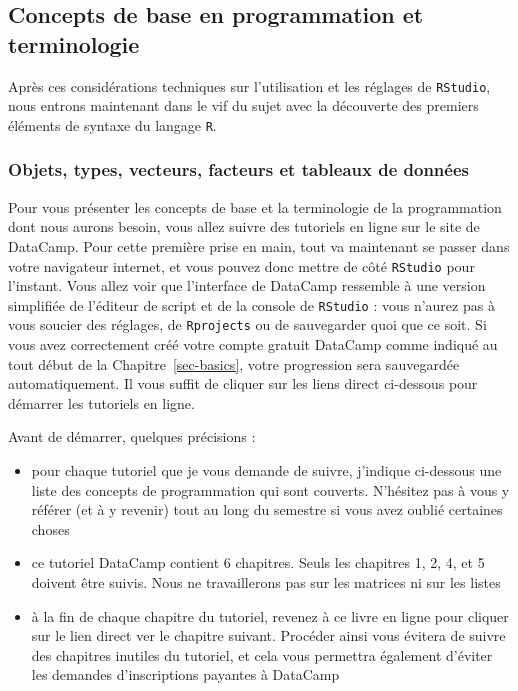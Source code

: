 \documentclass[
  a4paper,
  DIV=11,
  numbers=noendperiod,
  oneside]{scrreprt}
\providecommand{\tightlist}{%
  \setlength{\itemsep}{0pt}\setlength{\parskip}{0pt}}\usepackage{longtable,booktabs,array}
\begin{document}
\subsection{Concepts de base en programmation et
terminologie}\label{concepts-de-base-en-programmation-et-terminologie}

Après ces considérations techniques sur l'utilisation et les réglages de
\texttt{RStudio}, nous entrons maintenant dans le vif du sujet avec la
découverte des premiers éléments de syntaxe du langage \texttt{R}.

\subsubsection{Objets, types, vecteurs, facteurs et tableaux de
données}\label{sec-objects}

Pour vous présenter les concepts de base et la terminologie de la
programmation dont nous aurons besoin, vous allez suivre des tutoriels
en ligne sur le site de DataCamp. Pour cette première prise en main,
tout va maintenant se passer dans votre navigateur internet, et vous
pouvez donc mettre de côté \texttt{RStudio} pour l'instant. Vous allez
voir que l'interface de DataCamp ressemble à une version simplifiée de
l'éditeur de script et de la console de \texttt{RStudio} : vous n'aurez
pas à vous soucier des réglages, de \texttt{Rprojects} ou de sauvegarder
quoi que ce soit. Si vous avez correctement créé votre compte gratuit
DataCamp comme indiqué au tout début de la Chapitre~\ref{sec-basics},
votre progression sera sauvegardée automatiquement. Il vous suffit de
cliquer sur les liens direct ci-dessous pour démarrer les tutoriels en
ligne.

Avant de démarrer, quelques précisions :

\begin{itemize}
\tightlist
\item
  pour chaque tutoriel que je vous demande de suivre, j'indique
  ci-dessous une liste des concepts de programmation qui sont couverts.
  N'hésitez pas à vous y référer (et à y revenir) tout au long du
  semestre si vous avez oublié certaines choses
\item
  ce tutoriel DataCamp contient 6 chapitres. Seuls les chapitres 1, 2,
  4, et 5 doivent être suivis. Nous ne travaillerons pas sur les
  matrices ni sur les listes
\item
  à la fin de chaque chapitre du tutoriel, revenez à ce livre en ligne
  pour cliquer sur le lien direct ver le chapitre suivant. Procéder
  ainsi vous évitera de suivre des chapitres inutiles du tutoriel, et
  cela vous permettra également d'éviter les demandes d'inscriptions
  payantes à DataCamp
\end{itemize}
\end{document}
